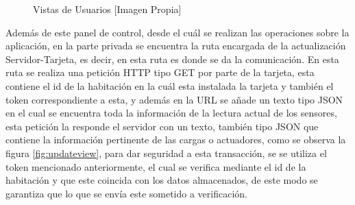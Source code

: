 \begin{figure}[H]
	\centering
	\caption{Vistas de Usuarios [Imagen Propia]}
	\label{fig:views}
\end{figure}

Además de este panel de control, desde el cuál se realizan las operaciones sobre la aplicación, en la parte privada se encuentra la ruta encargada de la actualización Servidor-Tarjeta, es decir, en esta ruta es donde se da la comunicación. En esta ruta se realiza una petición HTTP tipo GET por parte de la tarjeta, esta contiene el id de la habitación en la cuál esta instalada la tarjeta y también el token correspondiente a esta, y además en la URL se añade un texto tipo JSON en el cual se encuentra toda la información de la lectura actual de los sensores, esta petición la responde el servidor con un texto, también tipo JSON que contiene la información pertinente de las cargas o actuadores, como se observa la figura \ref{fig:updateview}, para dar seguridad a esta transacción, se se utiliza el token mencionado anteriormente, el cual se verifica mediante el id de la habitación y que este coincida con los datos almacenados, de este modo se garantiza que lo que se envía este sometido a verificación.\\

